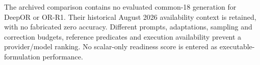 The archived comparison contains no evaluated common-18 generation for DeepOR or OR-R1. Their historical August 2026 availability context is retained, with no fabricated zero accuracy. Different prompts, adaptations, sampling and correction budgets, reference predicates and execution availability prevent a provider/model ranking. No scalar-only readiness score is entered as executable-formulation performance.
